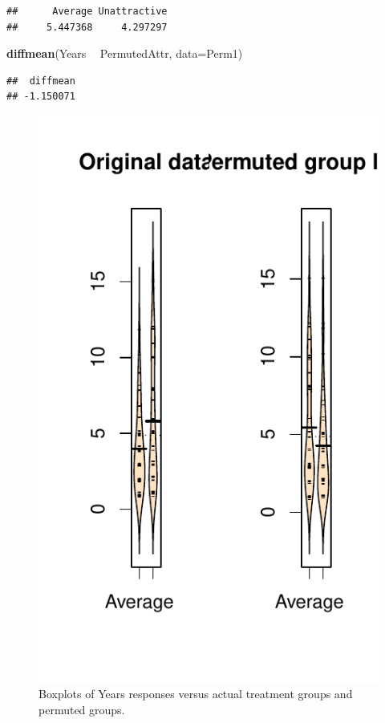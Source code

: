 \documentclass[]{book}
\newenvironment{Shaded}{\begin{snugshade}}{\end{snugshade}}
\newcommand{\KeywordTok}[1]{\textcolor[rgb]{0.13,0.29,0.53}{\textbf{#1}}}
\newcommand{\DataTypeTok}[1]{\textcolor[rgb]{0.13,0.29,0.53}{#1}}
\newcommand{\StringTok}[1]{\textcolor[rgb]{0.31,0.60,0.02}{#1}}
\newcommand{\OperatorTok}[1]{\textcolor[rgb]{0.81,0.36,0.00}{\textbf{#1}}}
\newcommand{\NormalTok}[1]{#1}
\theoremstyle{definition}
\theoremstyle{definition}
\theoremstyle{remark}
\begin{document}
\begin{verbatim}
##      Average Unattractive 
##     5.447368     4.297297
\end{verbatim}

\begin{Shaded}
\begin{Highlighting}[]
\KeywordTok{diffmean}\NormalTok{(Years }\OperatorTok{~}\StringTok{ }\NormalTok{PermutedAttr, }\DataTypeTok{data=}\NormalTok{Perm1)}
\end{Highlighting}
\end{Shaded}

\begin{verbatim}
##  diffmean 
## -1.150071
\end{verbatim}




\begin{figure}
\centering
\includegraphics{02-reintroductionToStatistics_files/figure-latex/Figure2-8-1.pdf}
\caption{\label{fig:Figure2-8}Boxplots of Years responses versus actual treatment groups
and permuted groups.}
\end{figure}
\end{document}
